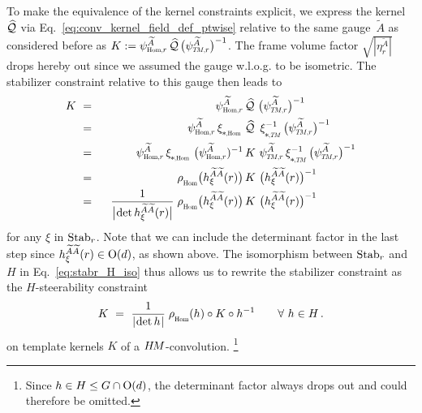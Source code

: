 To make the equivalence of the kernel constraints explicit, we express the kernel $\widehat{\mathcal{Q}}$ via Eq.~\eqref{eq:conv_kernel_field_def_ptwise} relative to the same gauge~$\widetilde{A}$ as considered before as
$K := \psiHomr^{\widetilde{A}}\, \Qhat\, \big(\psiTMr^{\widetilde{A}} \big)^{-1}$.
The frame volume factor $\sqrt{|\eta_r^{\widetilde{A}}|}$ drops hereby out since we assumed the gauge w.l.o.g. to be isometric.
The stabilizer constraint relative to this gauge then leads to
\begin{alignat}{3}
    K
    \ &=&\ \ \psiHomr^{\widetilde{A}}\, &\Qhat\ \big(\psiTMr^{\widetilde{A}} \big)^{-1} \notag \\
    \ &=&\ \ \psiHomr^{\widetilde{A}}\, \dxiHom\, &\Qhat\,\ \dxiTM^{-1}\, \big(\psiTMr^{\widetilde{A}} \big)^{-1} \notag \\
    \ &=&\ \ \psiHomr^{\widetilde{A}}\, \dxiHom\, \big(\psiHomr^{\widetilde{A}})^{-1}\, &K\ \psiTMr^{\widetilde{A}}\, \dxiTM^{-1}\, \big(\psiTMr^{\widetilde{A}} \big)^{-1} \notag \\
    \ &=&\ \ \rhoHom\big( h_\xi^{\widetilde{A}\widetilde{A}}(r) \big)\, &K\ \big( h_\xi^{\widetilde{A}\widetilde{A}}(r) \big)^{-1} \notag \\
    \ &=&\ \ \frac{1}{\big|\mkern-2mu \det h_\xi^{\widetilde{A}\widetilde{A}}(r) \big|} \;
        \rhoHom\big( h_\xi^{\widetilde{A}\widetilde{A}}(r) \big)\, &K\ \big( h_\xi^{\widetilde{A}\widetilde{A}}(r) \big)^{-1}
\end{alignat}
for any $\xi$ in $\operatorname{Stab}_{r}$.
Note that we can include the determinant factor in the last step since $h_\xi^{\widetilde{A}\widetilde{A}}(r) \in \operatorname{O}(d)$, as shown above.
The isomorphism between $\operatorname{Stab}_{r}$ and $H$ in Eq.~\eqref{eq:stabr_H_iso} thus allows us to rewrite the stabilizer constraint as the $H$-steerability constraint
\begin{align}
    K\ =\ \frac{1}{|\mkern-2mu \det h \mkern1mu|}\; \rhoHom(h) \circ K \circ h^{-1} \qquad \forall\ h \in H \,.
\end{align}
on template kernels $K$ of a $H\mkern-2.5muM$-convolution.%
\footnote{
    Since $h\in H \leq G\cap\operatorname{O}(d)$, the determinant factor always drops out and could therefore be omitted.
}



